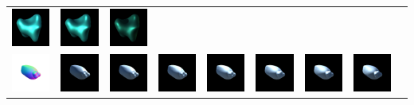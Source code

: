 \begin{center}
\begin{longtable}{@{}c@{}c@{}c@{}c@{}c@{}c@{}c@{}c@{}c@{}}
\includegraphics[width=0.1\linewidth]{training/23_5.png} & \includegraphics[width=0.1\linewidth]{training/23_6.png} &
\includegraphics[width=0.1\linewidth]{training/23_7.png} \\
\includegraphics[width=0.1\linewidth]{training/24_gt.png} & \includegraphics[width=0.1\linewidth]{training/24_0.png} &
\includegraphics[width=0.1\linewidth]{training/24_1.png} & \includegraphics[width=0.1\linewidth]{training/24_2.png} &
\includegraphics[width=0.1\linewidth]{training/24_3.png} & \includegraphics[width=0.1\linewidth]{training/24_4.png} &
\includegraphics[width=0.1\linewidth]{training/24_5.png} & \includegraphics[width=0.1\linewidth]{training/24_6.png} &

\end{longtable}
\end{center}
